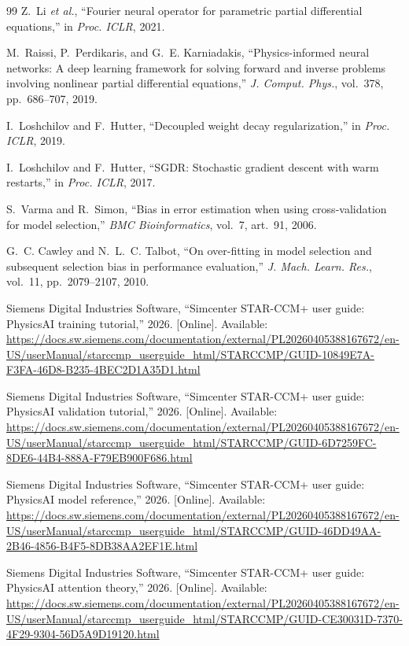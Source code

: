 \documentclass[journal]{IEEEtran}
\begin{document}
\begin{thebibliography}{99}
Z.~Li \emph{et al.}, ``Fourier neural operator for parametric partial
differential equations,'' in \emph{Proc. ICLR}, 2021.

M.~Raissi, P.~Perdikaris, and G.~E. Karniadakis, ``Physics-informed neural
networks: A deep learning framework for solving forward and inverse problems
involving nonlinear partial differential equations,'' \emph{J. Comput.
Phys.}, vol.~378, pp.~686--707, 2019.

I.~Loshchilov and F.~Hutter, ``Decoupled weight decay regularization,'' in
\emph{Proc. ICLR}, 2019.

I.~Loshchilov and F.~Hutter, ``SGDR: Stochastic gradient descent with warm
restarts,'' in \emph{Proc. ICLR}, 2017.

S.~Varma and R.~Simon, ``Bias in error estimation when using cross-validation
for model selection,'' \emph{BMC Bioinformatics}, vol.~7, art.~91, 2006.

G.~C. Cawley and N.~L.~C. Talbot, ``On over-fitting in model selection and
subsequent selection bias in performance evaluation,'' \emph{J. Mach. Learn.
Res.}, vol.~11, pp.~2079--2107, 2010.

Siemens Digital Industries Software, ``Simcenter STAR-CCM+ user guide:
PhysicsAI training tutorial,'' 2026. [Online]. Available:
\url{https://docs.sw.siemens.com/documentation/external/PL20260405388167672/en-US/userManual/starccmp_userguide_html/STARCCMP/GUID-10849E7A-F3FA-46D8-B235-4BEC2D1A35D1.html}

Siemens Digital Industries Software, ``Simcenter STAR-CCM+ user guide:
PhysicsAI validation tutorial,'' 2026. [Online]. Available:
\url{https://docs.sw.siemens.com/documentation/external/PL20260405388167672/en-US/userManual/starccmp_userguide_html/STARCCMP/GUID-6D7259FC-8DE6-44B4-888A-F79EB900F686.html}

Siemens Digital Industries Software, ``Simcenter STAR-CCM+ user guide:
PhysicsAI model reference,'' 2026. [Online]. Available:
\url{https://docs.sw.siemens.com/documentation/external/PL20260405388167672/en-US/userManual/starccmp_userguide_html/STARCCMP/GUID-46DD49AA-2B46-4856-B4F5-8DB38AA2EF1E.html}

Siemens Digital Industries Software, ``Simcenter STAR-CCM+ user guide:
PhysicsAI attention theory,'' 2026. [Online]. Available:
\url{https://docs.sw.siemens.com/documentation/external/PL20260405388167672/en-US/userManual/starccmp_userguide_html/STARCCMP/GUID-CE30031D-7370-4F29-9304-56D5A9D19120.html}

\end{thebibliography}
\end{document}
